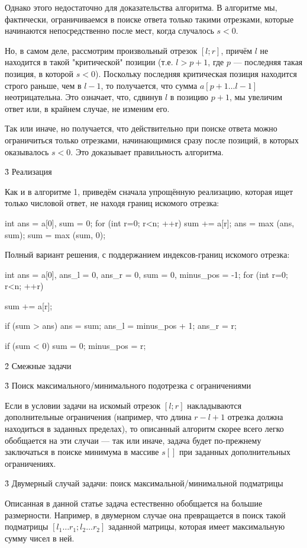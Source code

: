 Однако этого недостаточно для доказательства алгоритма. В алгоритме мы, фактически, ограничиваемся в поиске ответа только такими отрезками, которые начинаются непосредственно после мест, когда случалось $s<0$.

Но, в самом деле, рассмотрим произвольный отрезок $[l;r]$, причём $l$ не находится в такой "критической" позиции (т.е. $l > p+1$, где $p$ --- последняя такая позиция, в которой $s<0$). Поскольку последняя критическая позиция находится строго раньше, чем в $l-1$, то получается, что сумма $a[p+1 \ldots l-1]$ неотрицательна. Это означает, что, сдвинув $l$ в позицию $p+1$, мы увеличим ответ или, в крайнем случае, не изменим его.

Так или иначе, но получается, что действительно при поиске ответа можно ограничиться только отрезками, начинающимися сразу после позиций, в которых оказывалось $s<0$. Это доказывает правильность алгоритма.

\h3{ Реализация }

Как и в алгоритме 1, приведём сначала упрощённую реализацию, которая ищет только числовой ответ, не находя границ искомого отрезка:

\code
int ans = a[0],
	sum = 0;
for (int r=0; r<n; ++r) {
	sum += a[r];
	ans = max (ans, sum);
	sum = max (sum, 0);
}
\endcode

Полный вариант решения, с поддержанием индексов-границ искомого отрезка:

\code
int ans = a[0],
	ans_l = 0,
	ans_r = 0,
	sum = 0,
	minus_pos = -1;
for (int r=0; r<n; ++r) {
	sum += a[r];

	if (sum > ans) {
		ans = sum;
		ans_l = minus_pos + 1;
		ans_r = r;
	}

	if (sum < 0) {
		sum = 0;
		minus_pos = r;
	}
}
\endcode


\h2{ Смежные задачи }

\h3{ Поиск максимального/минимального подотрезка с ограничениями }

Если в условии задачи на искомый отрезок $[l;r]$ накладываются дополнительные ограничения (например, что длина $r-l+1$ отрезка должна находиться в заданных пределах), то описанный алгоритм скорее всего легко обобщается на эти случаи --- так или иначе, задача будет по-прежнему заключаться в поиске минимума в массиве $s[]$ при заданных дополнительных ограничениях.

\h3{ Двумерный случай задачи: поиск максимальной/минимальной подматрицы }

Описанная в данной статье задача естественно обобщается на большие размерности. Например, в двумерном случае она превращается в поиск такой подматрицы $[l_1 \ldots r_1; l_2 \ldots r_2]$ заданной матрицы, которая имеет максимальную сумму чисел в ней.

